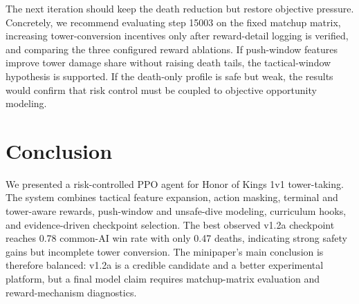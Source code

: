 \documentclass{article}
\begin{document}
The next iteration should keep the death reduction but restore objective pressure. Concretely, we recommend evaluating step 15003 on the fixed matchup matrix, increasing tower-conversion incentives only after reward-detail logging is verified, and comparing the three configured reward ablations. If push-window features improve tower damage share without raising death tails, the tactical-window hypothesis is supported. If the death-only profile is safe but weak, the results would confirm that risk control must be coupled to objective opportunity modeling.

\section{Conclusion}

We presented a risk-controlled PPO agent for Honor of Kings 1v1 tower-taking. The system combines tactical feature expansion, action masking, terminal and tower-aware rewards, push-window and unsafe-dive modeling, curriculum hooks, and evidence-driven checkpoint selection. The best observed v1.2a checkpoint reaches 0.78 common-AI win rate with only 0.47 deaths, indicating strong safety gains but incomplete tower conversion. The minipaper's main conclusion is therefore balanced: v1.2a is a credible candidate and a better experimental platform, but a final model claim requires matchup-matrix evaluation and reward-mechanism diagnostics.
\end{document}
